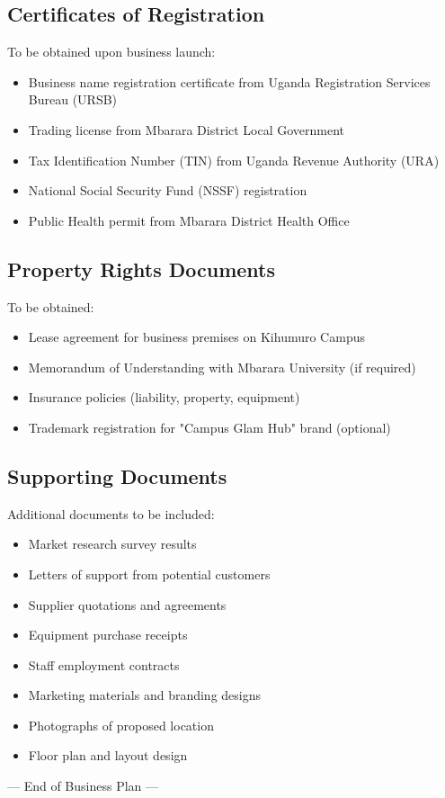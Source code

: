 \documentclass[a4paper,12pt]{article}
\begin{document}
\subsection{Certificates of Registration}

To be obtained upon business launch:

\begin{itemize}[leftmargin=2em]
    \item Business name registration certificate from Uganda Registration Services Bureau (URSB)
    \item Trading license from Mbarara District Local Government
    \item Tax Identification Number (TIN) from Uganda Revenue Authority (URA)
    \item National Social Security Fund (NSSF) registration
    \item Public Health permit from Mbarara District Health Office
\end{itemize}

\subsection{Property Rights Documents}

To be obtained:

\begin{itemize}[leftmargin=2em]
    \item Lease agreement for business premises on Kihumuro Campus
    \item Memorandum of Understanding with Mbarara University (if required)
    \item Insurance policies (liability, property, equipment)
    \item Trademark registration for "Campus Glam Hub" brand (optional)
\end{itemize}

\subsection{Supporting Documents}

Additional documents to be included:

\begin{itemize}[leftmargin=2em]
    \item Market research survey results
    \item Letters of support from potential customers
    \item Supplier quotations and agreements
    \item Equipment purchase receipts
    \item Staff employment contracts
    \item Marketing materials and branding designs
    \item Photographs of proposed location
    \item Floor plan and layout design
\end{itemize}

\vspace{2em}

\begin{center}
--- End of Business Plan ---
\end{center}
\end{document}
